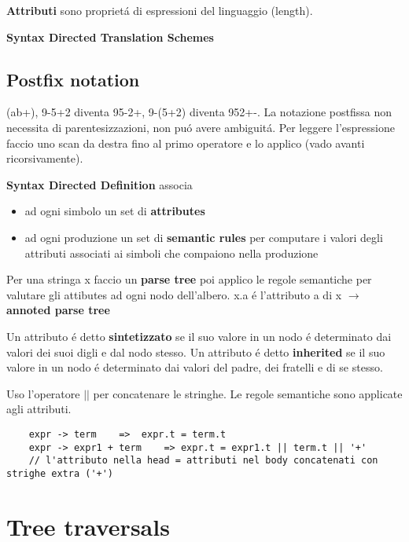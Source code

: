 \textbf{Attributi} sono propriet\'a di espressioni del linguaggio (length).

\textbf{Syntax Directed Translation Schemes} 

\subsection{Postfix notation} 
(ab+), 9-5+2 diventa 95-2+, 9-(5+2) diventa 952+-. La notazione postfissa non necessita di parentesizzazioni, non pu\'o avere ambiguit\'a.
Per leggere l'espressione faccio uno scan da destra fino al primo operatore e lo applico (vado avanti ricorsivamente).

\textbf{Syntax Directed Definition} associa 
\begin{itemize}
    \item ad ogni simbolo un set di \textbf{attributes}\\
    \item ad ogni produzione un set di \textbf{semantic rules} per computare i valori degli attributi associati ai simboli che 
        compaiono nella produzione\\
\end{itemize}

Per una stringa x faccio un \textbf{parse tree} poi applico le regole semantiche per valutare gli attibutes ad ogni nodo dell'albero.
x.a \'e l'attributo a di x $\rightarrow$ \textbf{annoted parse tree}


Un attributo \'e detto \textbf{sintetizzato} se il suo valore in un nodo \'e determinato dai valori dei suoi digli e dal nodo stesso.
Un attributo \'e detto \textbf{inherited} se il suo valore in un nodo \'e determinato dai valori del padre, dei fratelli e di se stesso.


Uso l'operatore $||$ per concatenare le stringhe. Le regole semantiche sono applicate agli attributi.

\begin{lstlisting}
    expr -> term    =>  expr.t = term.t 
    expr -> expr1 + term    => expr.t = expr1.t || term.t || '+'
    // l'attributo nella head = attributi nel body concatenati con strighe extra ('+')
\end{lstlisting}

\section{Tree traversals}

